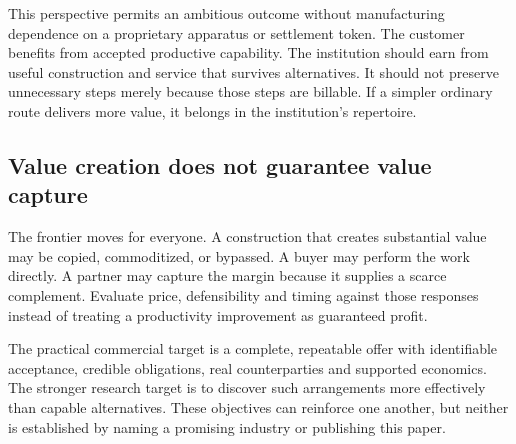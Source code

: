 This perspective permits an ambitious outcome without manufacturing dependence on a proprietary apparatus or settlement token. The customer benefits from accepted productive capability. The institution should earn from useful construction and service that survives alternatives. It should not preserve unnecessary steps merely because those steps are billable. If a simpler ordinary route delivers more value, it belongs in the institution's repertoire.

\subsection{Value creation does not guarantee value capture}
The frontier moves for everyone. A construction that creates substantial value may be copied, commoditized, or bypassed. A buyer may perform the work directly. A partner may capture the margin because it supplies a scarce complement. Evaluate price, defensibility and timing against those responses instead of treating a productivity improvement as guaranteed profit.

The practical commercial target is a complete, repeatable offer with identifiable acceptance, credible obligations, real counterparties and supported economics. The stronger research target is to discover such arrangements more effectively than capable alternatives. These objectives can reinforce one another, but neither is established by naming a promising industry or publishing this paper.
